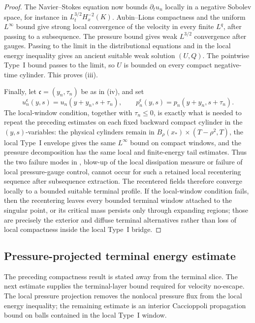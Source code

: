 \documentclass[11pt]{amsart}
\numberwithin{equation}{section}
\theoremstyle{plain}
\theoremstyle{definition}
\theoremstyle{remark}
\begin{document}
\begin{proof}
The Navier--Stokes equation now bounds \(\partial_tu_n\) locally in a negative
Sobolev space, for instance in \(L^{3/2}_tH^{-2}_x(K)\).  Aubin--Lions
compactness and the uniform \(L^\infty\) bound give strong local convergence of
the velocity in every finite \(L^q\), after passing to a subsequence.  The
pressure bound gives weak \(L^{3/2}\) convergence after gauges.  Passing to the
limit in the distributional equations and in the local energy inequality gives
an ancient suitable weak solution \((U,Q)\).  The pointwise Type~I bound passes
to the limit, so \(U\) is bounded on every compact negative-time cylinder.
This proves (iii).

Finally, let \(\mathfrak c=(y_n,\tau_n)\) be as in (iv), and set
\[
   u_n^{\mathfrak c}(y,s)=u_n(y+y_n,s+\tau_n),
   \qquad
   p_n^{\mathfrak c}(y,s)=p_n(y+y_n,s+\tau_n).
\]
The local-window condition, together with \(\tau_n\le0\), is exactly what is
needed to repeat the preceding estimates on each fixed backward compact cylinder
in the \((y,s)\)-variables: the
physical cylinders remain in \(B_\rho(x_*)\times(T-\rho^2,T)\), the local
Type~I envelope gives the same \(L^\infty\) bound on compact windows, and the
pressure decomposition has the same local and finite-energy tail estimates.
Thus the two failure modes in , blow-up of the
local dissipation measure or failure of local pressure-gauge control, cannot
occur for such a retained local recentering sequence after subsequence
extraction.  The recentered fields therefore converge locally to a bounded
suitable terminal profile.  If the local-window condition fails, then the
recentering leaves every bounded terminal window attached to the singular
point, or its critical mass persists only through expanding regions; those are
precisely the exterior and diffuse terminal alternatives rather than loss of
local compactness inside the local Type~I bridge.
\end{proof}

\subsection{Pressure-projected terminal energy estimate}
\label{subsec:pressure-projected-terminal-gap}

The preceding compactness result is stated away from the terminal
slice.  The next estimate supplies the terminal-layer bound required for
velocity no-escape.  The local pressure projection removes the nonlocal pressure
flux from the local energy inequality; the remaining estimate is an interior
Caccioppoli propagation bound on balls contained in the local Type~I window.
\end{document}

